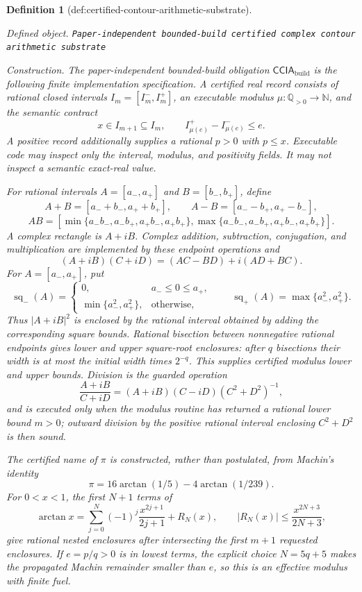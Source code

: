 \documentclass{article}
\newtheorem{definition}{Definition}
\begin{document}
\begin{definition}[def:certified-contour-arithmetic-substrate]\label{def:certified-contour-arithmetic-substrate}
\par\smallskip\noindent\emph{Defined object.} \texttt{Paper-\allowbreak{}independent bounded-\allowbreak{}build certified complex contour arithmetic substrate}
\par\smallskip\noindent\emph{Construction.} The paper-independent bounded-build obligation \(\mathsf{CCIA}_{\mathrm{build}}\) is the following finite implementation specification.  A certified real record consists of rational closed intervals \(I_m=[I_m^-,I_m^+]\), an executable modulus \(\mu:\mathbb Q_{>0}\to\mathbb N\), and the semantic contract
\[
 x\in I_{m+1}\subseteq I_m,
 \qquad
 I_{\mu(e)}^+-I_{\mu(e)}^-\le e.
\]
A positive record additionally supplies a rational \(p>0\) with \(p\le x\).  Executable code may inspect only the interval, modulus, and positivity fields.  It may not inspect a semantic exact-real value.

For rational intervals \(A=[a_-,a_+]\) and \(B=[b_-,b_+]\), define
\[
 A+B=[a_-+b_-,a_++b_+],
 \qquad
 A-B=[a_--b_+,a_+-b_-],
\]
\[
 A B=
 [\min\{a_-b_-,a_-b_+,a_+b_-,a_+b_+\},
  \max\{a_-b_-,a_-b_+,a_+b_-,a_+b_+\}].
\]
A complex rectangle is \(A+iB\).  Complex addition, subtraction, conjugation, and multiplication are implemented by these endpoint operations and
\[
 (A+iB)(C+iD)=(AC-BD)+i(AD+BC).
\]
For \(A=[a_-,a_+]\), put
\[
 \operatorname{sq}_{-}(A)=
 \begin{cases}
 0,&a_-\le0\le a_+,\\
 \min\{a_-^2,a_+^2\},&\text{otherwise},
 \end{cases}
 \qquad
 \operatorname{sq}_{+}(A)=\max\{a_-^2,a_+^2\}.
\]
Thus \(|A+iB|^2\) is enclosed by the rational interval obtained by adding the corresponding square bounds.  Rational bisection between nonnegative rational endpoints gives lower and upper square-root enclosures: after \(q\) bisections their width is at most the initial width times \(2^{-q}\).  This supplies certified modulus lower and upper bounds.  Division is the guarded operation
\[
 \frac{A+iB}{C+iD}
 =(A+iB)(C-iD)(C^2+D^2)^{-1},
\]
and is executed only when the modulus routine has returned a rational lower bound \(m>0\); outward division by the positive rational interval enclosing \(C^2+D^2\) is then sound.

The certified name of \(\pi\) is constructed, rather than postulated, from Machin's identity
\[
 \pi=16\arctan(1/5)-4\arctan(1/239).
\]
For \(0<x<1\), the first \(N+1\) terms of
\[
 \arctan x=\sum_{j=0}^{N}(-1)^j\frac{x^{2j+1}}{2j+1}+R_N(x),
 \qquad
 |R_N(x)|\le\frac{x^{2N+3}}{2N+3},
\]
give rational nested enclosures after intersecting the first \(m+1\) requested enclosures.  If \(e=p/q>0\) is in lowest terms, the explicit choice \(N=5q+5\) makes the propagated Machin remainder smaller than \(e\), so this is an effective modulus with finite fuel.


\end{definition}
\end{document}
